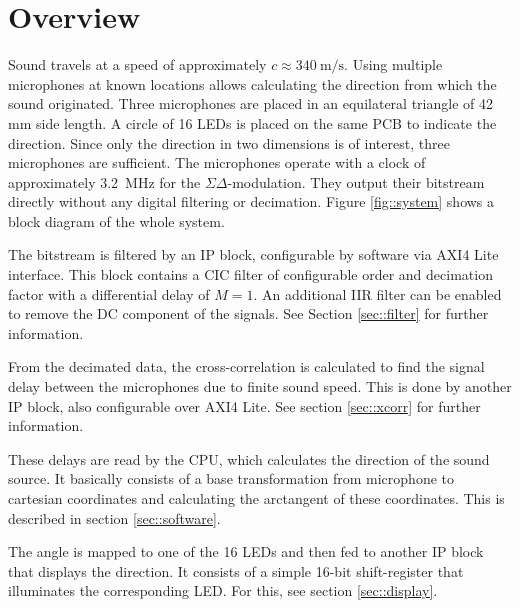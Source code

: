 \section{Overview}
Sound travels at a speed of approximately $c\approx \SI{340}{\meter\per\s}$.
Using multiple microphones at known locations allows calculating the direction from which the sound originated.
Three microphones are placed in an equilateral triangle of 42 mm side length.
A circle of 16 LEDs is placed on the same PCB to indicate the direction.
Since only the direction in two dimensions is of interest, three microphones are sufficient.
The microphones operate with a clock of approximately \SI{3.2}{\mega\hertz} for the $\Sigma\Delta$-modulation.
They output their bitstream directly without any digital filtering or decimation.
Figure \ref{fig::system} shows a block diagram of the whole system.

The bitstream is filtered by an IP block, configurable by software via AXI4 Lite interface.
This block contains a CIC filter of configurable order and decimation factor with a differential delay of $M=1$.
An additional IIR filter can be enabled to remove the DC component of the signals.
See Section \ref{sec::filter} for further information.

From the decimated data, the cross-correlation is calculated to find the signal delay between the microphones due to finite sound speed.
This is done by another IP block, also configurable over AXI4 Lite.
See section \ref{sec::xcorr} for further information.

These delays are read by the CPU, which calculates the direction of the sound source. 
It basically consists of a base transformation from microphone to cartesian coordinates and calculating the arctangent of these coordinates.
This is described in section \ref{sec::software}.

The angle is mapped to one of the 16 LEDs and then fed to another IP block that displays the direction.
It consists of a simple 16-bit shift-register that illuminates the corresponding LED.
For this, see section \ref{sec::display}.

